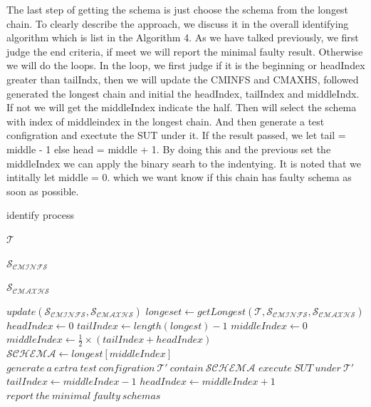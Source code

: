 \documentclass[10pt,journal,cspaper,compsoc]{IEEEtran}
\begin{document}
The last step of getting the schema is just choose the schema from the longest chain. To clearly describe the approach, we discuss it in the overall identifying algorithm which is list in the Algorithm 4. As we have talked previously, we first judge the end criteria, if meet we will report the minimal faulty result. Otherwise we will do the loops. In the loop, we first judge if it is the beginning or headIndex greater than tailIndx, then we will update the CMINFS and CMAXHS, followed generated the longest chain and initial the headIndex, tailIndex and middleIndx. If not we will get the middleIndex indicate the half. Then will select the schema with index of middleindex in the longest chain. And then generate a test configration and exectute the SUT under it. If the result passed, we let tail = middle - 1 else head = middle + 1. By doing this and the previous set the middleIndex we can apply the binary searh to the indentying. It is noted that we intitally let middle = 0. which we want know if this chain has faulty schema as soon as possible.
\begin{algorithm}
  \caption{identify process}
  \begin{algorithmic}[1]
    \Require  $\mathcal{T}$ 

     $\mathcal{S_{CMINFS}}$ 

     $\mathcal{S_{CMAXHS}}$ 

       \State $update(\mathcal{S_{CMINFS}},\mathcal{S_{CMAXHS}})$
       \State $longeset \leftarrow getLongest( \mathcal{T},\mathcal{S_{CMINFS}},\mathcal{S_{CMAXHS}})$
       \State $headIndex \leftarrow 0$
       \State $tailIndex \leftarrow length(longest) - 1$
       \State $middleIndex \leftarrow 0$
     \Else
       \State $middleIndex \leftarrow \frac{1}{2} \times (tailIndex + headIndex)$
     \EndIf
       \State $\mathcal{SCHEMA} \leftarrow longest[middleIndex]$
       \State $generate\ a\ extra\ test\ configration\ \mathcal{T'}\ contain\ \mathcal{SCHEMA}$
       \State $execute\ SUT\ under\ \mathcal{T'}$
       \State $tailIndex \leftarrow middleIndex - 1$
     \Else
       \State $headIndex \leftarrow middleIndex + 1$
     \EndIf
   \EndWhile
   \State $report\ the\ minimal\ faulty\ schemas$
  \end{algorithmic}
\end{algorithm}
\end{document}

